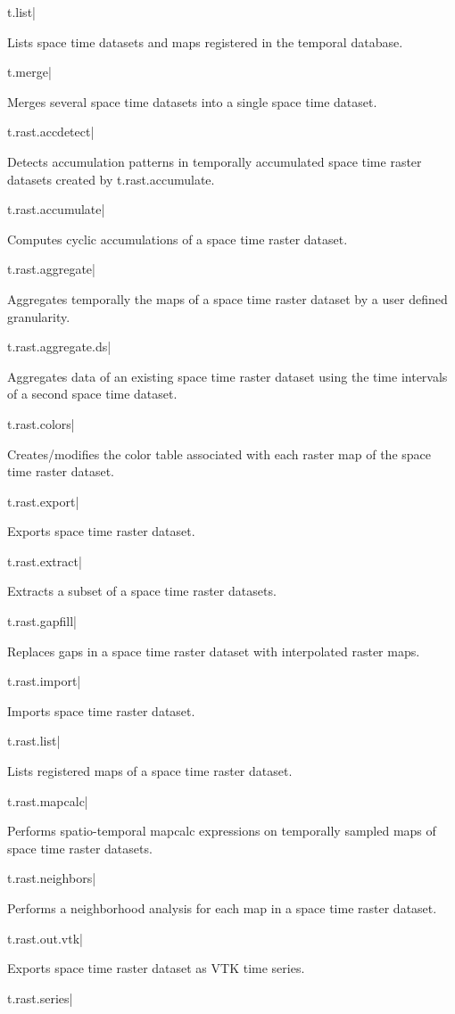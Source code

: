 t.list|

Lists space time datasets and maps registered in the temporal database.

t.merge|

Merges several space time datasets into a single space time dataset.

t.rast.accdetect|

Detects accumulation patterns in temporally accumulated space time
raster datasets created by t.rast.accumulate.

t.rast.accumulate|

Computes cyclic accumulations of a space time raster dataset.

t.rast.aggregate|

Aggregates temporally the maps of a space time raster dataset by a
user defined granularity.

t.rast.aggregate.ds|

Aggregates data of an existing space time raster dataset using the
time intervals of a second space time dataset.

t.rast.colors|

Creates/modifies the color table associated with each raster map of
the space time raster dataset.

t.rast.export|

Exports space time raster dataset.

t.rast.extract|

Extracts a subset of a space time raster datasets.

t.rast.gapfill|

Replaces gaps in a space time raster dataset with interpolated raster
maps.

t.rast.import|

Imports space time raster dataset.

t.rast.list|

Lists registered maps of a space time raster dataset.

t.rast.mapcalc|

Performs spatio-temporal mapcalc expressions on temporally sampled
maps of space time raster datasets.

t.rast.neighbors|

Performs a neighborhood analysis for each map in a space time raster
dataset.

t.rast.out.vtk|

Exports space time raster dataset as VTK time series.

t.rast.series|

